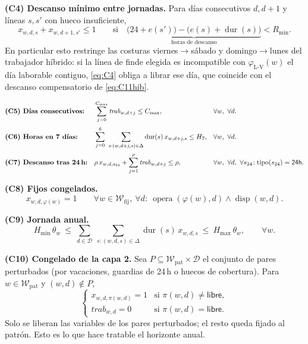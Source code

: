 \documentclass[11pt,a4paper]{article}
\newcommand{\opera}{\operatorname{opera}}
\newcommand{\dur}{\operatorname{dur}}
\newcommand{\tipo}{\operatorname{tipo}}
\newcommand{\avail}{\operatorname{disp}}
\newcommand{\work}{\mathit{trab}}
\newcommand{\Dom}{\mathcal{D}}
\newcommand{\Wk}{\mathcal{W}}
\newcommand{\Wfij}{\Wk_{\mathrm{fij}}}
\newcommand{\Wpat}{\Wk_{\mathrm{pat}}}
\newcommand{\Lv}{\mathrm{L\text{-}V}}
\newcommand{\Rmin}{R_{\min}}
\newcommand{\Hsiete}{H_{7}}
\newcommand{\Cmax}{C_{\max}}
\newcommand{\Hmin}{H_{\min}}
\newcommand{\Hmax}{H_{\max}}
\theoremstyle{definition}
\begin{document}
\noindent\textbf{(C4) Descanso mínimo entre jornadas.} Para días consecutivos $d,d+1$ y
líneas $s,s'$ con hueco insuficiente,
\begin{equation}\label{eq:C4}
  x_{w,d,s}+x_{w,d+1,s'}\le 1
  \qquad\text{si}\quad
  \underbrace{\big(24+e(s')\big)-\big(e(s)+\dur(s)\big)}_{\text{horas de descanso}}<\Rmin .
\end{equation}
En particular esto restringe las costuras viernes$\to$sábado y domingo$\to$lunes del
trabajador híbrido: si la línea de finde elegida es incompatible con $\varphi_{\Lv}(w)$ el
día laborable contiguo, \eqref{eq:C4} obliga a librar ese día, que coincide con el descanso
compensatorio de \eqref{eq:C11hib}.

\begin{align}
  &\textbf{(C5) Días consecutivos:} &&
    \sum_{j=0}^{\Cmax}\work_{w,d+j}\le \Cmax, && \forall w,\ \forall d. \label{eq:C5}\\[2pt]
  &\textbf{(C6) Horas en 7 días:} &&
    \sum_{j=0}^{6}\ \sum_{s:(w,d+j,s)\in\Delta}\dur(s)\,x_{w,d+j,s}\le \Hsiete,
    && \forall w,\ \forall d. \label{eq:C6}\\[2pt]
  &\textbf{(C7) Descanso tras 24\,h:} &&
    \rho\,x_{w,d,s_{24}}+\sum_{j=1}^{\rho}\work_{w,d+j}\le \rho,
    && \forall w,\ \forall d,\ \forall s_{24}\!: \tipo(s_{24})=\textsf{24h}. \label{eq:C7}
\end{align}

\noindent\textbf{(C8) Fijos congelados.}
\begin{equation}\label{eq:C8b}
  x_{w,d,\varphi(w)}=1 \qquad \forall w\in\Wfij,\ \forall d:\ \opera(\varphi(w),d)\wedge\avail(w,d).
\end{equation}

\noindent\textbf{(C9) Jornada anual.}
\begin{equation}\label{eq:C9}
  \Hmin\,\theta_{w}\ \le\ \sum_{d\in\Dom}\ \sum_{s:(w,d,s)\in\Delta}\dur(s)\,x_{w,d,s}\ \le\ \Hmax\,\theta_{w},
  \qquad \forall w.
\end{equation}

\noindent\textbf{(C10) Congelado de la capa 2.} Sea $P\subseteq\Wpat\times\Dom$ el conjunto
de pares perturbados (por vacaciones, guardias de 24\,h o huecos de cobertura). Para
$w\in\Wpat$ y $(w,d)\notin P$,
\begin{equation}\label{eq:C10}
  \begin{cases}
    x_{w,d,\pi(w,d)}=1 & \text{si } \pi(w,d)\neq\textsf{libre},\\
    \work_{w,d}=0 & \text{si } \pi(w,d)=\textsf{libre}.
  \end{cases}
\end{equation}
Solo se liberan las variables de los pares perturbados; el resto queda fijado al patrón.
Esto es lo que hace tratable el horizonte anual.
\end{document}
